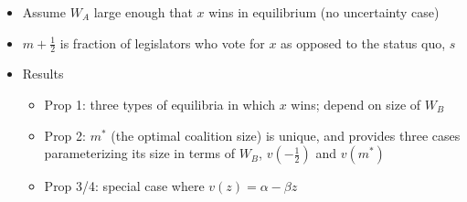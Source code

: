 \documentclass[12pt]{article}
\begin{document}
\begin{itemize}
	\item Assume $W_A$ large enough that $x$ wins in equilibrium (no uncertainty case)
	\item $m + \frac{1}{2}$ is fraction of legislators who vote for $x$ as opposed to the status quo, $s$
	\item Results
	\begin{itemize}
		\item Prop 1: three types of equilibria in which $x$ wins; depend on size of $W_B$
		\item Prop 2: $m^*$ (the optimal coalition size) is unique, and provides three cases parameterizing its size in terms of $W_B$, $v(-\frac{1}{2})$ and $v(m^*)$
		\item Prop 3/4: special case where $v(z) = \alpha - \beta z$
	\end{itemize}
\end{itemize}
\end{document}
